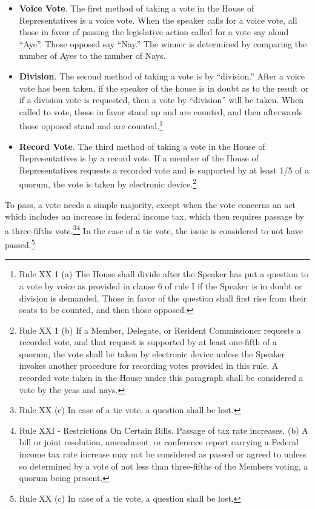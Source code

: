 \begin{itemize}
\item \textbf{Voice Vote}.  The first method of taking a vote in the House of Representatives is a voice vote.  When the speaker calls for a voice vote, all those in favor of passing the legislative action called for a vote say aloud ``Aye''.  Those opposed say ``Nay.''  The winner is determined by comparing the number of Ayes to the number of Nays.
\item \textbf{Division}.  The second method of taking a vote is by ``division.''  After a voice vote has been taken, if the speaker of the house is in doubt as to the result or if a division vote is requested, then a vote by ``division'' will be taken.  When called to vote, those in favor stand up and are counted, and then afterwards those opposed stand and are counted.\footnote{Rule XX 1 (a) The House shall divide after the Speaker has put a question to a vote by voice as provided in clause 6 of rule I if the Speaker is in doubt or division is demanded. Those in favor of the question shall first rise from their seats to be counted, and then those opposed.}
\item \textbf{Record Vote}.  The third method of taking a vote in the House of Representatives is by a record vote.  If a member of the House of Representatives requests a recorded vote and is supported by at least 1/5 of a quorum, the vote is taken by electronic device.\footnote{Rule XX 1 (b) If a Member, Delegate, or Resident Commissioner requests a recorded vote, and that request is supported by at least one-fifth of a quorum, the vote shall be taken by electronic device unless the Speaker invokes another procedure for recording votes provided in this rule. A recorded vote taken in the House under this paragraph shall be considered a vote by the yeas and nays.}
\end{itemize}

To pass, a vote needs a simple majority, except when the vote concerns an act which includes an increase in federal income tax, which then requires passage by a three-fifths vote.\footnote{Rule XX (c) In case of a tie vote, a question shall be lost.}\footnote{Rule XXI - Restrictions On Certain Bills.  Passage of tax rate increases. (b) A bill or joint resolution, amendment, or conference report carrying a Federal income tax rate increase may not be considered as passed or agreed to unless so determined by a vote of not less than three-fifths of the Members voting, a quorum being present.}
In the case of a tie vote, the issue is considered to not have passed.\footnote{Rule XX (c) In case of a tie vote, a question shall be lost.}


